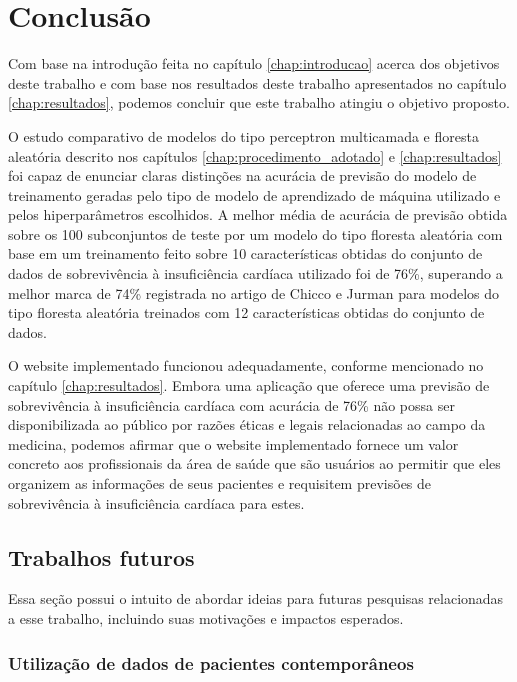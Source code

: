 \chapter{Conclusão} \label{chap:conclusao}

Com base na introdução feita no capítulo \ref{chap:introducao} acerca dos objetivos deste trabalho e com base nos resultados deste trabalho apresentados no capítulo \ref{chap:resultados}, podemos concluir que este trabalho atingiu o objetivo proposto.

O estudo comparativo de modelos do tipo perceptron multicamada e floresta aleatória descrito nos capítulos \ref{chap:procedimento_adotado} e \ref{chap:resultados} foi capaz de enunciar claras distinções na acurácia de previsão do modelo de treinamento geradas pelo tipo de modelo de aprendizado de máquina utilizado e pelos hiperparâmetros escolhidos. A melhor média de acurácia de previsão obtida sobre os 100 subconjuntos de teste por um modelo do tipo floresta aleatória com base em um treinamento feito sobre 10 características obtidas do conjunto de dados de sobrevivência à insuficiência cardíaca utilizado \cite{larxel_dataset} foi de 76\%, superando a melhor marca de 74\% registrada no artigo de Chicco e Jurman \cite{chicco2020} para modelos do tipo floresta aleatória treinados com 12 características obtidas do conjunto de dados.

O website implementado funcionou adequadamente, conforme mencionado no capítulo \ref{chap:resultados}. Embora uma aplicação que oferece uma previsão de sobrevivência à insuficiência cardíaca com acurácia de 76\% não possa ser disponibilizada ao público por razões éticas e legais relacionadas ao campo da medicina, podemos afirmar que o website implementado fornece um valor concreto aos profissionais da área de saúde que são usuários ao permitir que eles organizem as informações de seus pacientes e requisitem previsões de sobrevivência à insuficiência cardíaca para estes.

\section{Trabalhos futuros}

Essa seção possui o intuito de abordar ideias para futuras pesquisas relacionadas a esse trabalho, incluindo suas motivações e impactos esperados.

\subsection{Utilização de dados de pacientes contemporâneos}

